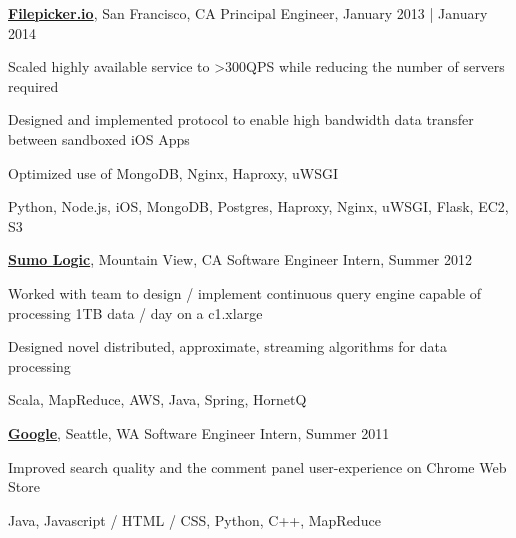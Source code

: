 \documentclass[10pt]{article}
\newenvironment{outerlist}[1][\enskip\textbullet]%
        {\begin{itemize}[#1]}{\end{itemize}%
         \vspace{-.6\baselineskip}}
\newenvironment{innerlist}[1][\enskip\textbullet]%
        {\begin{compactitem}[#1]}{\end{compactitem}}
\newcommand{\blankline}{\quad\pagebreak[2]}
\begin{document}
\blankline

\href{http://www.filestack.com/}{\textbf{Filepicker.io}}, San Francisco, CA \hfill{Principal Engineer, January 2013  | January 2014}
 \begin{outerlist}
 	\item[] \begin{innerlist}[-]
		\item Scaled highly available service to \textgreater 300QPS while reducing the
number of servers required
		\item Designed and implemented protocol to enable high bandwidth data
transfer between sandboxed iOS Apps
		\item Optimized use of MongoDB, Nginx, Haproxy, uWSGI
		\item Python, Node.js, iOS, MongoDB, Postgres, Haproxy,
Nginx, uWSGI, Flask, EC2, S3 
	\end{innerlist}
\end{outerlist}

\blankline

\href{http://www.sumologic.com/}{\textbf{Sumo Logic}}, Mountain View, CA \hfill{Software Engineer Intern, Summer 2012}
 \begin{outerlist}
 	\item[] \begin{innerlist}[-]
		\item Worked with team to design / implement continuous query engine
capable of processing 1TB data / day on a c1.xlarge
	\item Designed novel distributed, approximate, streaming algorithms for
data processing
	\item Scala, MapReduce, AWS, Java, Spring, HornetQ
	\end{innerlist}
\end{outerlist}
\blankline

\href{http://www.google.com/}{\textbf{Google}}, Seattle, WA \hfill{Software Engineer Intern, Summer 2011}
 \begin{outerlist}
 	\item[] \begin{innerlist}[-]
		\item Improved search quality and the comment panel user-experience on
Chrome Web Store
		\item Java, Javascript / HTML / CSS, Python, C++, MapReduce
	\end{innerlist}
\end{outerlist}
\vspace{-1mm}
\end{document}
